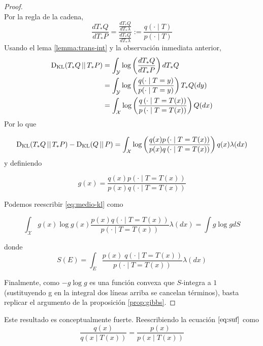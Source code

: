 \documentclass[main.tex]{subfiles}
\begin{document}
\begin{proof} $\ $ \\
Por la regla de la cadena, 
\begin{equation*}
	\frac{dT_*Q}{dT_*P}=\frac{\frac{dT_*Q}{dT_*\lambda}}{\frac{dT_*Q}{dT_*\lambda}}
	:= \frac{q(\cdot\mid T)}{p(\cdot\mid T)}
\end{equation*}
Usando el lema \ref{lemma:trans-int} y la observación inmediata anterior,
\begin{align*}
\operatorname*{D_{KL}}(T_*Q\operatorname*{\mid\mid} T_*P) &= \int_\mathcal{Y}\log\left(\frac{dT_*Q}{dT_*P}\right)dT_*Q \\
&= \int_\mathcal{Y} \log\left(\frac{q(\cdot\mid T=y)}{p(\cdot\mid T=y)}\right)T_*Q(dy) \\
&= \int_\mathcal{X}\log\left(\frac{q\left(\cdot\mid T=T(x)\right)}{p\left(\cdot\mid T=T(x)\right)}\right)Q(dx) \\
\end{align*}
Por lo que 

\begin{equation}\label{eq:medio-kl}
\operatorname*{D_{KL}}(T_*Q\operatorname*{\mid\mid} T_*P)-\operatorname*{D_{KL}}(Q\operatorname*{\mid\mid} P)
	=\int_\mathcal{X} \log\left(
	\frac{q(x)p\left(\cdot\mid T= T(x)\right)}{p(x)q\left(\cdot\mid T=T(x)\right)}
	\right)
	q(x)\lambda(dx) \\
\end{equation}
y definiendo

\begin{equation*}
g(x)=\frac{q(x)p\left(\cdot\mid T=T(x)\right)}{p(x)q\left(\cdot\mid T=T(x)\right)}
\end{equation*}

Podemos reescribir \eqref{eq:medio-kl} como

\begin{equation*}
\int_\mathcal{X}g(x)\log g(x)\frac{p(x)q( \cdot \mid T=T(x))}{p( \cdot\mid T=T(x))}\lambda(dx)
= \int g \log g dS
\end{equation*}

donde 
\begin{equation*}
S(E) = \int_E \frac{p(x)\; q(\cdot \mid T=T(x))}{p\left(\cdot \mid T=T(x)\right)}\lambda(dx)
\end{equation*}

Finalmente, como $-g\log g$ es una función convexa que $S$-integra a $1$ (sustituyendo g en la integral dos líneas arriba se cancelan términos), basta replicar el argumento de la proposición \ref{prop:gibbs}.
\end{proof}

Este resultado es conceptualmente fuerte. Reescribiendo la ecuación $\eqref{eq:suf}$ como 
\begin{equation*}
	\frac{q(x)}{q(x\mid T(x))} = \frac{p(x)}{p(x\mid T(x))}
\end{equation*}
\end{document}
